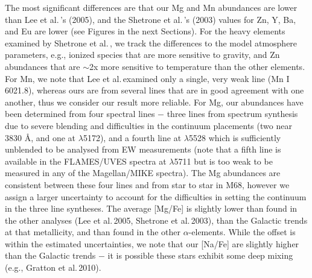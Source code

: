 \documentclass{emulateapj}
\newcommand\etal{{\rm et al.\,}}
\begin{document}
The most significant differences are that our Mg and Mn abundances
are lower than Lee \etal's (2005), and the Shetrone \etal's (2003)  
values for Zn, Y, Ba, and Eu are lower (see Figures in the next Sections).
For the heavy elements examined by Shetrone \etal, 
we track the differences to the model atmosphere parameters,
e.g., ionized species that are more sensitive to gravity, 
and Zn abundances that are $\sim$2x more sensitive to temperature 
than the other elements.  
For Mn, we note that Lee \etal  examined only a single, very 
weak line (Mn I 6021.8), whereas ours are from several lines that
are in good agreement with one another, thus we consider our result
more reliable.    
For Mg, our abundances have been determined from four spectral lines 
$-$ three lines from spectrum synthesis due to severe blending and 
difficulties in the continuum placements (two near 3830 \AA, and 
one at $\lambda$5172), and a fourth line at $\lambda$5528 which is 
sufficiently unblended to be analysed from EW measurements (note 
that a fifth line is available in the FLAMES/UVES spectra at
$\lambda$5711 but is too weak to be measured in any of the 
Magellan/MIKE spectra).  
%
The Mg abundances are consistent between these four lines and from
star to star in M68, however we assign a larger uncertainty to 
account for the difficulties in setting the continuum in the three 
line syntheses.   
The average [Mg/Fe] is slightly lower than found in the other 
analyses (Lee \etal 2005, Shetrone \etal 2003), than the Galactic
trends at that metallicity, and than found in the other 
$\alpha$-elements.   While the offset is within the estimated 
uncertainties, we note that our [Na/Fe] are slightly higher than
the Galactic trends $-$ it is possible these stars exhibit some
deep mixing (e.g., Gratton \etal 2010).
%
\end{document}
